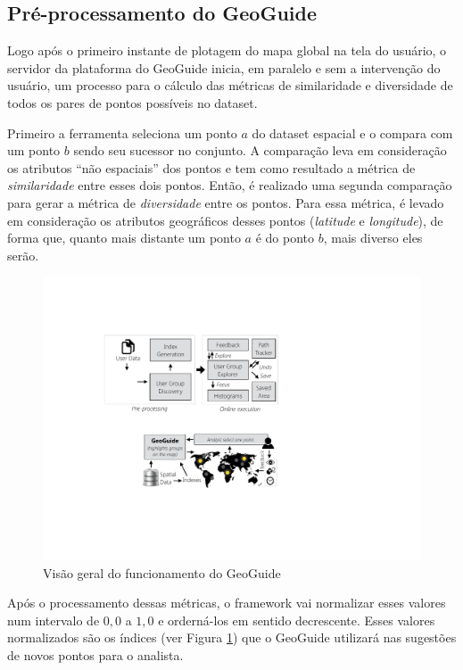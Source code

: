 \subsection{Pré-processamento do GeoGuide}

Logo após o primeiro instante de plotagem do mapa global na tela do usuário, o servidor da plataforma do GeoGuide inicia, em paralelo e sem a intervenção do usuário, um processo para o cálculo das métricas de similaridade e diversidade de todos os pares de pontos possíveis no dataset.

Primeiro a ferramenta seleciona um ponto $a$ do dataset espacial e o compara com um ponto $b$ sendo seu sucessor no conjunto. A comparação leva em consideração os atributos ``não espaciais'' dos pontos e tem como resultado a métrica de \textit{similaridade} entre esses dois pontos. Então, é realizado uma segunda comparação para gerar a métrica de \textit{diversidade} entre os pontos. Para essa métrica, é levado em consideração os atributos geográficos desses pontos (\textit{latitude} e \textit{longitude}), de forma que, quanto mais distante um ponto $a$ é do ponto $b$, mais diverso eles serão.  

\begin{figure}[h]
	\centering
	\includegraphics[width=\textwidth]{images/geoguide-pre-processamento.pdf}
	\caption{Visão geral do funcionamento do GeoGuide}
	\label{fig:geoguide-pre-processamento}
	\vspace{-10pt}
\end{figure}

Após o processamento dessas métricas, o framework vai normalizar esses valores num intervalo de $0,0$ a $1,0$ e orderná-los em sentido decrescente. Esses valores normalizados são os índices (ver Figura \ref{fig:geoguide-pre-processamento}) que o GeoGuide utilizará nas sugestões de novos pontos para o analista.

